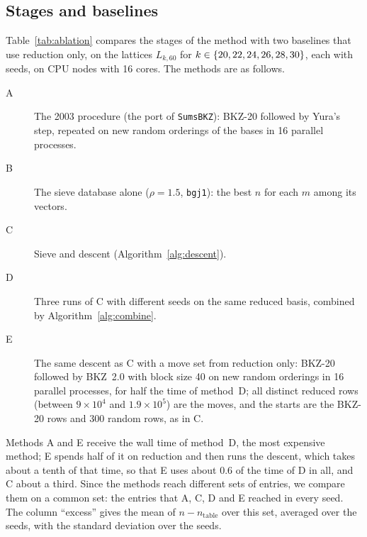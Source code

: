 \documentclass[11pt]{amsart}
\theoremstyle{definition}
\theoremstyle{remark}
\begin{document}
\begin{table}[htbp]
\centering\small

\caption{Entries with $m\le16$ and $17\le k\le30$ improved by each pool, without combination
($H$, $R$) and after Algorithm~\ref{alg:combine} (starred). $H$: identities of Meyrignac's
database and the 2003 archive with bases at most $120$; $H_{\mathrm{all}}$: all of them; $R$:
identities stored by our runs; $RH$: both.}\label{tab:controls}
\end{table}

\subsection{Stages and baselines}\label{sec:ablation}
Table~\ref{tab:ablation} compares the stages of the method with two baselines that use
reduction only, on the lattices $L_{k,60}$ for $k\in\{20, 22, 24, 26, 28, 30\}$, each with \AblSeeds{} seeds, on CPU nodes with
16 cores. The methods are as follows.
\begin{description}
\item[A] The 2003 procedure (the port of \texttt{SumsBKZ}): BKZ-20 followed by Yura's step,
repeated on new random orderings of the bases in 16 parallel processes.
\item[B] The sieve database alone ($\rho=1.5$, \texttt{bgj1}): the best $n$ for each $m$ among
its vectors.
\item[C] Sieve and descent (Algorithm~\ref{alg:descent}).
\item[D] Three runs of C with different seeds on the same reduced basis, combined by
Algorithm~\ref{alg:combine}.
\item[E] The same descent as C with a move set from reduction only: BKZ-20 followed by BKZ~2.0
with block size 40 on new random orderings in 16 parallel processes, for half the time of
method~D; all
distinct reduced rows (between $9\times10^4$ and $1.9\times10^5$) are the moves, and the
starts are the BKZ-20 rows and 300 random rows, as in C.
\end{description}
Methods A and E receive the wall time of method~D, the most expensive method; E spends half of
it on reduction and then runs the descent, which takes about a tenth of that time, so that E
uses about $0.6$ of the time of D in all, and C about a third. Since the methods reach different sets of entries, we compare
them on a common set: the entries that A, C, D and E reached in every seed. The column
``excess'' gives the mean of $n-n_{\mathrm{table}}$ over this set, averaged over the seeds,
with the standard deviation over the seeds.
\end{document}
